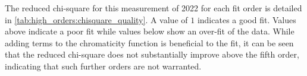 

The reduced chi-square for this measurement of 2022 for each fit order is detailed in
\cref{tab:high_orders:chisquare_quality}. A value of $1$ indicates a good fit. Values above indicate
a poor fit while values below show an over-fit of the data.
While adding terms to the chromaticity function is beneficial to the fit, it can be seen that the
reduced chi-square does not substantially improve above the fifth order, indicating that such
further orders are not warranted.

